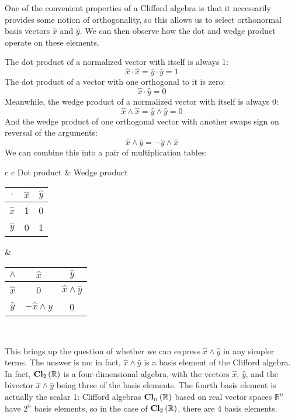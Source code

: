 One of the convenient properties of a Clifford algebra is that it necessarily provides some notion
of orthogonality, so this allows us to select orthonormal basis vectors $\hat{x}$ and $\hat{y}$. We
can then observe how the dot and wedge product operate on these elements.

The dot product of a normalized vector with itself is always 1:
$$
\hat{x} \cdot \hat{x} = \hat{y} \cdot \hat{y} = 1
$$
The dot product of a vector with one orthogonal to it is zero:
$$
\hat{x} \cdot \hat{y} = 0
$$
Meanwhile, the wedge product of a normalized vector with itself is always 0:
$$
\hat{x} \wedge \hat{x} = \hat{y} \wedge \hat{y} = 0
$$
And the wedge product of one orthogonal vector with another swaps sign on reversal of the arguments:
$$
\hat{x} \wedge \hat{y} = -\hat{y} \wedge \hat{x}
$$
We can combine this into a pair of multiplication tables:
\begin{center}
    \begin{tabular}{c c}
        Dot product & Wedge product \\
        \begin{tabular}{ c | c  c }
            $\cdot$     & $\hat{x}$  & $\hat{y}$ \\ \hline
            $\hat{x}$   & 1          & 0         \\
            $\hat{y}$   & 0          & 1         \\
        \end{tabular}
        &
        \begin{tabular}{ c | c  c }
            $\wedge$    & $\hat{x}$                 & $\hat{y}$                 \\ \hline
            $\hat{x}$   & 0                         & $\hat{x} \wedge \hat{y}$  \\
            $\hat{y}$   & $-\hat{x} \wedge \hat{y}$ & 0                         \\
        \end{tabular} \\
    \end{tabular} 
\end{center}

This brings up the question of whether we can express $\hat{x} \wedge \hat{y}$ in any simpler terms.
The answer is no: in fact, $\hat{x} \wedge \hat{y}$ is a basis element of the Clifford algebra. In
fact, $\operatorname{\mathbf{Cl}}_{2}\left(\mathbb{R}\right)$ is a four-dimensional algebra, with the vectors $\hat{x}$, $\hat{y}$, and the
bivector $\hat{x} \wedge \hat{y}$ being three of the basis elements. The fourth basis element is
actually the scalar 1: Clifford algebras $\operatorname{\mathbf{Cl}}_{n}\left(\mathbb{R}\right)$ based on real vector spaces $\mathbb{R}^n$ have
$2^n$ basis elements, so in the case of $\operatorname{\mathbf{Cl}}_{2}\left(\mathbb{R}\right)$, there are 4 basis elements.

